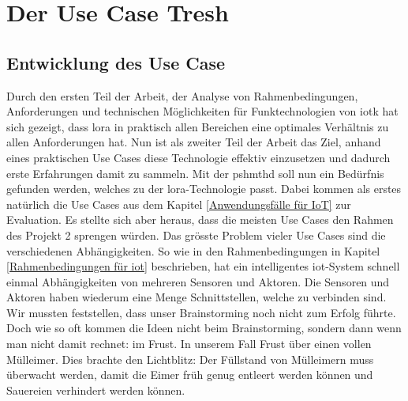 \chapter{Der Use Case Tresh}
\section{Entwicklung des Use Case}
Durch den ersten Teil der Arbeit, der Analyse von Rahmenbedingungen, Anforderungen und technischen Möglichkeiten für Funktechnologien von \gls{iotk} hat sich gezeigt, dass \gls{lora} in praktisch allen Bereichen eine optimales Verhältnis zu allen Anforderungen hat. Nun ist als zweiter Teil der Arbeit das Ziel, anhand eines praktischen Use Cases diese Technologie effektiv einzusetzen und dadurch erste Erfahrungen damit zu sammeln. Mit der \gls{pshmthd} soll nun ein Bedürfnis gefunden werden, welches zu der \gls{lora}-Technologie passt. Dabei kommen als erstes natürlich die Use Cases aus dem Kapitel \ref{Anwendungsfälle für IoT} zur Evaluation. Es stellte sich aber heraus, dass die meisten Use Cases den Rahmen des Projekt 2 sprengen würden. Das grösste Problem vieler Use Cases sind die verschiedenen Abhängigkeiten. So wie in den Rahmenbedingungen in Kapitel \ref{Rahmenbedingungen für iot} beschrieben, hat ein intelligentes \gls{iot}-System schnell einmal Abhängigkeiten von mehreren Sensoren und Aktoren. Die Sensoren und Aktoren haben wiederum eine Menge Schnittstellen, welche zu verbinden sind. Wir mussten feststellen, dass unser Brainstorming noch nicht zum Erfolg führte. Doch wie so oft kommen die Ideen nicht beim Brainstorming, sondern dann wenn man nicht damit rechnet: im Frust. In unserem Fall Frust über einen vollen Mülleimer. Dies brachte den Lichtblitz: Der Füllstand von Mülleimern muss überwacht werden, damit die Eimer früh genug entleert werden können und Sauereien verhindert werden können.


